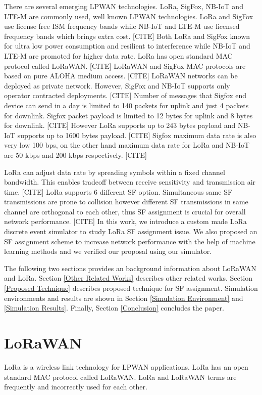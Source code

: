 \documentclass[conference]{IEEEtran}
\begin{document}
\par There are several emerging LPWAN technologies. LoRa, SigFox, NB-IoT and LTE-M are commonly used, well known LPWAN technologies. LoRa and SigFox use license free ISM frequency bands while NB-IoT and LTE-M use licensed frequency bands which brings extra cost. [CITE] Both LoRa and SigFox known for ultra low power consumption and resilient to interference while NB-IoT and LTE-M are promoted for higher data rate. LoRa has open standard MAC protocol called LoRaWAN. [CITE] LoRaWAN and SigFox MAC protocols are based on pure ALOHA medium access. [CITE] LoRaWAN networks can be deployed as private network. However, SigFox and NB-IoT supports only operator contracted deployments. [CITE] Number of messages that Sigfox end device can send in a day is limited to 140 packets for uplink and just 4 packets for downlink. Sigfox packet payload is limited to 12 bytes for uplink and 8 bytes for downlink. [CITE] However LoRa supports up to 243 bytes payload and NB-IoT supports up to 1600 bytes payload. [CITE] Sigfox maximum data rate is also very low 100 bps, on the other hand maximum data rate for LoRa and NB-IoT are 50 kbps and 200 kbps respectively. [CITE]

\par LoRa can adjust data rate by spreading symbols within a fixed channel bandwidth. This enables tradeoff between receive sensitivity and transmission air time. [CITE] LoRa supports 6 different SF option. Simultaneous same SF transmissions are prone to collision however different SF transmissions in same channel are orthogonal to each other, thus SF assignment is crucial for overall network performance. [CITE] In this work, we introduce a custom made LoRa discrete event simulator to study LoRa SF assignment issue. We also proposed an SF assignment scheme to increase network performance with the help of machine learning methods and we verified our proposal using our simulator.

\par The following two sections provides an background information about LoRaWAN and LoRa. Section \ref{Other Related Works} describes other related works. Section \ref{Proposed Technique} describes proposed technique for SF assignment. Simulation environments and results are shown in Section \ref{Simulation Environment} and \ref{Simulation Results}. Finally, Section \ref{Conclusion} concludes the paper.


\section{LoRaWAN} \label{LoRaWAN}
\par LoRa is a wireless link technology for LPWAN applications. LoRa has an open standard MAC protocol called LoRaWAN. LoRa and LoRaWAN terms are frequently and incorrectly used for each other.
\end{document}
